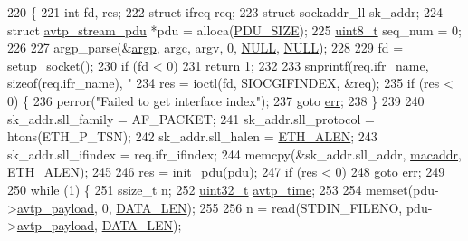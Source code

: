 \begin{DoxyCode}
220 \{
221     \textcolor{keywordtype}{int} fd, res;
222     \textcolor{keyword}{struct }ifreq req;
223     \textcolor{keyword}{struct }sockaddr\_ll sk\_addr;
224     \textcolor{keyword}{struct }\hyperlink{structavtp__stream__pdu}{avtp\_stream\_pdu} *pdu = alloca(\hyperlink{aaf-talker_8c_a4bdc13655ee7bf4cf0e66d16e22dc103}{PDU\_SIZE});
225     \hyperlink{stdint_8h_aba7bc1797add20fe3efdf37ced1182c5}{uint8\_t} seq\_num = 0;
226 
227     argp\_parse(&\hyperlink{aaf-talker_8c_ab70c96531b1b652d70c221cfaf3207f3}{argp}, argc, argv, 0, \hyperlink{openavb__types__base__pub_8h_a070d2ce7b6bb7e5c05602aa8c308d0c4}{NULL}, \hyperlink{openavb__types__base__pub_8h_a070d2ce7b6bb7e5c05602aa8c308d0c4}{NULL});
228 
229     fd = \hyperlink{aaf-talker_8c_aad31b1ae23d50a606d0b3cc45d346f4e}{setup\_socket}();
230     \textcolor{keywordflow}{if} (fd < 0)
231         \textcolor{keywordflow}{return} 1;
232 
233     snprintf(req.ifr\_name, \textcolor{keyword}{sizeof}(req.ifr\_name), \textcolor{stringliteral}{"%
234     res = ioctl(fd, SIOCGIFINDEX, &req);
235     \textcolor{keywordflow}{if} (res < 0) \{
236         perror(\textcolor{stringliteral}{"Failed to get interface index"});
237         \textcolor{keywordflow}{goto} \hyperlink{gst__avb__playbin_8c_a6ce68847c12434f60d1b2654a3dc3409}{err};
238     \}
239 
240     sk\_addr.sll\_family = AF\_PACKET;
241     sk\_addr.sll\_protocol = htons(ETH\_P\_TSN);
242     sk\_addr.sll\_halen = \hyperlink{openavb__avdecc__pub_8h_a9822d89774e0d6ddaa06503950130423}{ETH\_ALEN};
243     sk\_addr.sll\_ifindex = req.ifr\_ifindex;
244     memcpy(&sk\_addr.sll\_addr, \hyperlink{aaf-talker_8c_a951f0a7da0c9d9009218fb069f9d3f2a}{macaddr}, \hyperlink{openavb__avdecc__pub_8h_a9822d89774e0d6ddaa06503950130423}{ETH\_ALEN});
245 
246     res = \hyperlink{aaf-talker_8c_af259dd94b2af738f7d96b177c1ab8ce2}{init\_pdu}(pdu);
247     \textcolor{keywordflow}{if} (res < 0)
248         \textcolor{keywordflow}{goto} \hyperlink{gst__avb__playbin_8c_a6ce68847c12434f60d1b2654a3dc3409}{err};
249 
250     \textcolor{keywordflow}{while} (1) \{
251         ssize\_t n;
252         \hyperlink{parse_8c_a6eb1e68cc391dd753bc8ce896dbb8315}{uint32\_t} \hyperlink{avtp_8h_a81ec49d93f7a916531f4d97214f47515}{avtp\_time};
253 
254         memset(pdu->\hyperlink{structavtp__stream__pdu_af7de5ad9772244bef16d6266d874498d}{avtp\_payload}, 0, \hyperlink{aaf-talker_8c_af02e45f15080b8ec9dd7b286157617ff}{DATA\_LEN});
255 
256         n = read(STDIN\_FILENO, pdu->\hyperlink{structavtp__stream__pdu_af7de5ad9772244bef16d6266d874498d}{avtp\_payload}, \hyperlink{aaf-talker_8c_af02e45f15080b8ec9dd7b286157617ff}{DATA\_LEN});
}
\end{DoxyCode}
